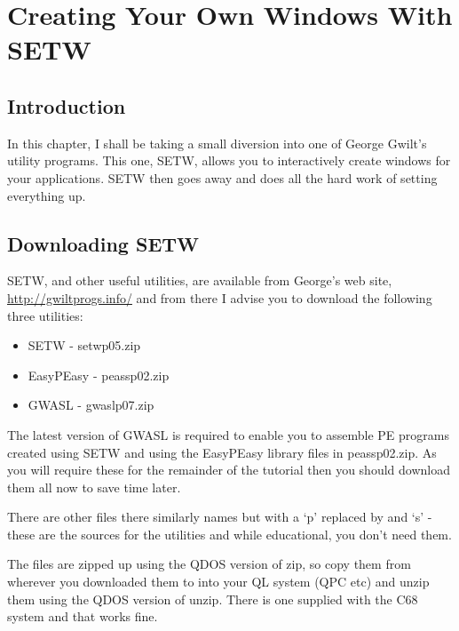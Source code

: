 \chapter{Creating Your Own Windows With SETW}

\label{ch24}%

\section{Introduction}
\label{ch24-intro}%

In this chapter, I shall be taking a small diversion into one
        of George Gwilt's utility programs. This one, SETW, allows you to interactively
        create windows for your applications. SETW then goes away and does all the hard
        work of setting everything up.

\section{Downloading SETW}
\label{ch24-setw}%

SETW, and other useful utilities, are available from George's web site, \url{http://gwiltprogs.info/} and from there I advise you to download the following three utilities:
\begin{itemize}[itemsep=0pt]

\item{}SETW -{} setwp05.zip


\item{}EasyPEasy -{} peassp02.zip


\item{}GWASL -{} gwaslp07.zip

\end{itemize}

The latest version of GWASL is required to enable you to assemble PE
        programs created using SETW and using the EasyPEasy library files in peassp02.zip.
        As you will require these for the remainder of the tutorial then you should
        download them all now to save time later.

There are other files there similarly names but with a `p' replaced by and
        `s' -{} these are the sources for the utilities and while educational, you don't
        need them.

The files are zipped up using the QDOS version of zip, so copy them from
        wherever you downloaded them to into your QL system (QPC etc) and unzip them using
        the QDOS version of unzip. There is one supplied with the C68 system and that
        works fine.

